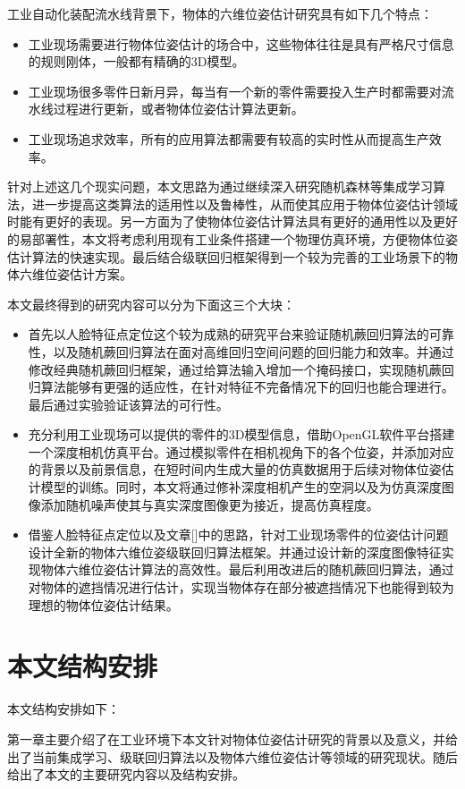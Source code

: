 工业自动化装配流水线背景下，物体的六维位姿估计研究具有如下几个特点：
\begin{itemize}
\item 工业现场需要进行物体位姿估计的场合中，这些物体往往是具有严格尺寸信息的规则刚体，一般都有精确的3D模型。
\item 工业现场很多零件日新月异，每当有一个新的零件需要投入生产时都需要对流水线过程进行更新，或者物体位姿估计算法更新。
\item 工业现场追求效率，所有的应用算法都需要有较高的实时性从而提高生产效率。
\end{itemize}
针对上述这几个现实问题，本文思路为通过继续深入研究随机森林等集成学习算法，进一步提高这类算法的适用性以及鲁棒性，从而使其应用于物体位姿估计领域时能有更好的表现。另一方面为了使物体位姿估计算法具有更好的通用性以及更好的易部署性，本文将考虑利用现有工业条件搭建一个物理仿真环境，方便物体位姿估计算法的快速实现。最后结合级联回归框架得到一个较为完善的工业场景下的物体六维位姿估计方案。

本文最终得到的研究内容可以分为下面这三个大块：
\begin{itemize}
\item 首先以人脸特征点定位这个较为成熟的研究平台来验证随机蕨回归算法的可靠性，以及随机蕨回归算法在面对高维回归空间问题的回归能力和效率。并通过修改经典随机蕨回归框架，通过给算法输入增加一个掩码接口，实现随机蕨回归算法能够有更强的适应性，在针对特征不完备情况下的回归也能合理进行。最后通过实验验证该算法的可行性。
\item 充分利用工业现场可以提供的零件的3D模型信息，借助OpenGL软件平台搭建一个深度相机仿真平台。通过模拟零件在相机视角下的各个位姿，并添加对应的背景以及前景信息，在短时间内生成大量的仿真数据用于后续对物体位姿估计模型的训练。同时，本文将通过修补深度相机产生的空洞以及为仿真深度图像添加随机噪声使其与真实深度图像更为接近，提高仿真程度。
\item 借鉴人脸特征点定位以及文章[]中的思路，针对工业现场零件的位姿估计问题设计全新的物体六维位姿级联回归算法框架。并通过设计新的深度图像特征实现物体六维位姿估计算法的高效性。最后利用改进后的随机蕨回归算法，通过对物体的遮挡情况进行估计，实现当物体存在部分被遮挡情况下也能得到较为理想的物体位姿估计结果。
\end{itemize}


\section{本文结构安排}

本文结构安排如下：

第一章主要介绍了在工业环境下本文针对物体位姿估计研究的背景以及意义，并给出了当前集成学习、级联回归算法以及物体六维位姿估计等领域的研究现状。随后给出了本文的主要研究内容以及结构安排。


